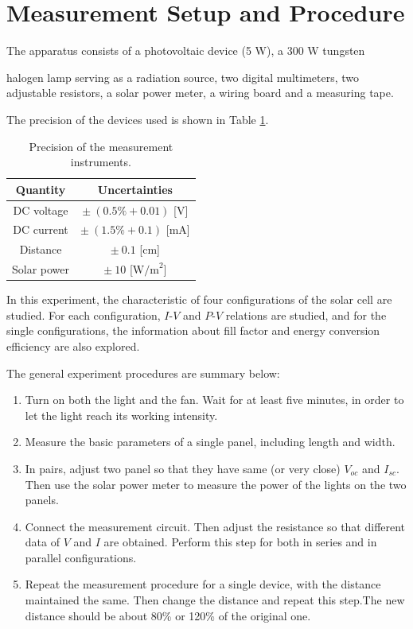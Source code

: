 \documentclass{article}
\begin{document}
		\section{Measurement Setup and Procedure}
The apparatus consists of a photovoltaic device (5 W), a 300 W tungsten{halogen lamp serving as a radiation source, two digital multimeters, two adjustable resistors, a solar power meter, a wiring board and a measuring tape.

The precision of the devices used is shown in Table \ref{tab.precision}.

\begin{table}[H]
    \centering
    \begin{tabular}{cc}
        \toprule
        Quantity    & Uncertainties           \\
        \midrule
        DC voltage  & $\pm~(0.5\% + 0.01)$ [V]  \\
        DC current  & $\pm~(1.5\% + 0.1)$ [mA]  \\
        Distance    & $\pm~0.1$ [cm]            \\
        Solar power & $\pm~10$ [$\text{W/m}^2$] \\
        \bottomrule
    \end{tabular}
    \caption{Precision of the measurement instruments.}\label{tab.precision}
\end{table}

In this experiment, the characteristic of four configurations of the solar cell are studied. For each configuration, $I$-$V$ and $P$-$V$ relations are studied, and for the single configurations, the information about fill factor and energy conversion efficiency are also explored.

The general experiment procedures are summary below:

\begin{enumerate}
\item Turn on both the light and the fan. Wait for at least five minutes, in order to let the light reach its working intensity.
\item Measure the basic parameters of a single panel, including length and width. 
\item In pairs, adjust two panel so that they have same (or very close) $V_{oc}$ and $I_{sc}$. Then use the solar power meter to measure the power of the lights on the two panels.
\item Connect the measurement circuit. Then adjust the resistance so that different data of $V$ and $I$ are obtained. Perform this step for both in series and in parallel configurations.
\item Repeat the measurement procedure for a single device, with the distance maintained the same. Then change the distance and repeat this step.The new distance should be about 80\% or 120\% of the original one.
\end{enumerate}

}
\end{document}
